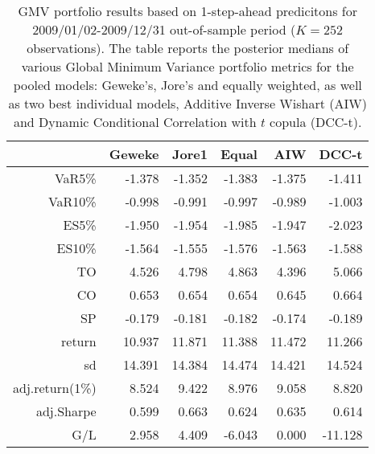 \begin{table}[ht]
\centering
\caption{GMV portfolio results based on 1-step-ahead predicitons 
             for  2009/01/02-2009/12/31 out-of-sample period ($K=252$ observations).
             The table reports the posterior medians of various Global Minimum
             Variance portfolio metrics for the pooled models: 
             Geweke's, Jore's and equally weighted, 
             as well as two best individual models, Additive Inverse Wishart (AIW) and 
             Dynamic Conditional Correlation with $t$ copula (DCC-t).} 
\label{table:gmvfull3}
\begin{tabular}{rrrrrr}
  \hline
 & Geweke & Jore1 & Equal & AIW & DCC-t \\ 
  \hline
VaR5\% & -1.378 & -1.352 & -1.383 & -1.375 & -1.411 \\ 
  VaR10\% & -0.998 & -0.991 & -0.997 & -0.989 & -1.003 \\ 
  ES5\% & -1.950 & -1.954 & -1.985 & -1.947 & -2.023 \\ 
  ES10\% & -1.564 & -1.555 & -1.576 & -1.563 & -1.588 \\ 
  TO & 4.526 & 4.798 & 4.863 & 4.396 & 5.066 \\ 
  CO & 0.653 & 0.654 & 0.654 & 0.645 & 0.664 \\ 
  SP & -0.179 & -0.181 & -0.182 & -0.174 & -0.189 \\ 
   \hline
return & 10.937 & 11.871 & 11.388 & 11.472 & 11.266 \\ 
  sd & 14.391 & 14.384 & 14.474 & 14.421 & 14.524 \\ 
  adj.return(1\%) & 8.524 & 9.422 & 8.976 & 9.058 & 8.820 \\ 
  adj.Sharpe & 0.599 & 0.663 & 0.624 & 0.635 & 0.614 \\ 
  G/L & 2.958 & 4.409 & -6.043 & 0.000 & -11.128 \\ 
   \hline
\end{tabular}
\end{table}
